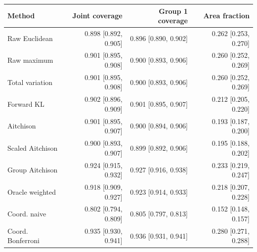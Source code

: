 \begin{tabular}{lrrr}
\toprule
Method & Joint coverage & Group 1 coverage & Area fraction \\
\midrule
Raw Euclidean & 0.898 [0.892, 0.905] & 0.896 [0.890, 0.902] & 0.262 [0.253, 0.270] \\
Raw maximum & 0.901 [0.895, 0.908] & 0.900 [0.893, 0.906] & 0.260 [0.252, 0.269] \\
Total variation & 0.901 [0.895, 0.908] & 0.900 [0.893, 0.906] & 0.260 [0.252, 0.269] \\
Forward KL & 0.902 [0.896, 0.909] & 0.901 [0.895, 0.907] & 0.212 [0.205, 0.220] \\
Aitchison & 0.901 [0.895, 0.907] & 0.900 [0.894, 0.906] & 0.193 [0.187, 0.200] \\
Scaled Aitchison & 0.900 [0.893, 0.907] & 0.899 [0.892, 0.906] & 0.195 [0.188, 0.202] \\
Group Aitchison & 0.924 [0.915, 0.932] & 0.927 [0.916, 0.938] & 0.233 [0.219, 0.247] \\
Oracle weighted & 0.918 [0.909, 0.927] & 0.923 [0.914, 0.933] & 0.218 [0.207, 0.228] \\
Coord. naive & 0.802 [0.794, 0.809] & 0.805 [0.797, 0.813] & 0.152 [0.148, 0.157] \\
Coord. Bonferroni & 0.935 [0.930, 0.941] & 0.936 [0.931, 0.941] & 0.280 [0.271, 0.288] \\
\bottomrule
\end{tabular}
